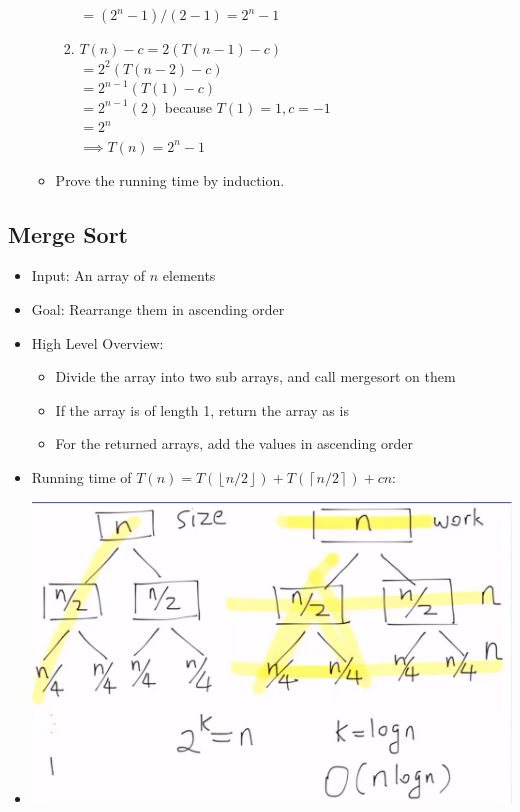 \begin{itemize}
\begin{itemize}
\begin{enumerate}
                $= (2^n - 1)/(2 - 1) = 2^n - 1$
            \item
                $T(n) - c = 2(T(n-1) - c)$ \\
                $= 2^2(T(n-2) - c)$ \\
                $= 2^{n-1}(T(1) - c)$ \\
                $= 2^{n-1}(2)$ because $T(1) = 1, c = -1$ \\
                $= 2^n$ \\
                $\implies T(n) = 2^n - 1$
        \end{enumerate}
        \item Prove the running time by induction.
    \end{itemize}
\end{itemize}

\subsection{Merge Sort}
\begin{itemize}
    \item Input: An array of $n$ elements
    \item Goal: Rearrange them in ascending order
    \item High Level Overview:
    \begin{itemize}
        \item Divide the array into two sub arrays, and call mergesort on them
        \item If the array is of length 1, return the array as is
        \item For the returned arrays, add the values in ascending order
    \end{itemize}
    \item Running time of $T(n) = T(\left\lfloor n/2 \right\rfloor) + T(\left\lceil n/2 \right\rceil) + cn$:
    \item[] \includegraphics[width=\textwidth]{lecture10/images/merge-sort-tree.png}
\end{itemize}
